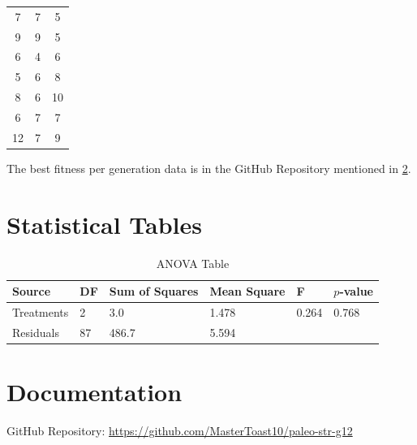 \documentclass{strrespaper-trad}
\begin{document}
\begin{table}[htbp]
\begin{tabular}{ccc}
				7       & 7   & 5                         \\
				9       & 9   & 5                         \\
				6       & 4   & 6                         \\
				5       & 6   & 8                         \\
				8       & 6   & 10                        \\
				6       & 7   & 7                         \\
				12      & 7   & 9                         \\
				\bottomrule
			\end{tabular}
		\end{table}

		The best fitness per generation data is in the GitHub Repository mentioned in \ref{apx:documentation}.

	\chapter{Statistical Tables}
		\begin{table}[htbp]
			\centering
			\caption{ANOVA Table}
			\label{tab:ANOVA}
			\begin{tabular}{llllll}
				\toprule
				Source     & DF & Sum of Squares & Mean Square & F     & $p$-value \\
				\midrule
				Treatments & 2  & 3.0            & 1.478       & 0.264 & 0.768     \\
				Residuals  & 87 & 486.7          & 5.594       &       &           \\
				\bottomrule
			\end{tabular}
		\end{table}

	\chapter{Documentation} \label{apx:documentation}
		\medskip\bigskip
		GitHub Repository: \url{https://github.com/MasterToast10/paleo-str-g12}
\end{document}
